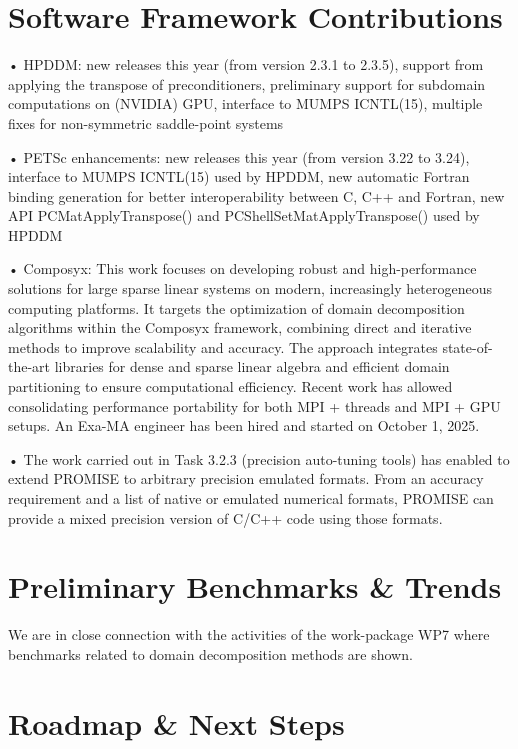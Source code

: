 \section{Software Framework Contributions}
 • HPDDM: new releases this year (from version 2.3.1 to 2.3.5), support from applying the transpose of preconditioners, preliminary support for subdomain computations on (NVIDIA) GPU, interface to MUMPS ICNTL(15), multiple fixes for non-symmetric saddle-point systems
 
 • PETSc enhancements: new releases this year (from version 3.22 to 3.24), interface to MUMPS ICNTL(15) used by HPDDM, new automatic Fortran binding generation for better interoperability between C, C++ and Fortran, new API PCMatApplyTranspose() and PCShellSetMatApplyTranspose() used by HPDDM
 
 • Composyx: %
 This work focuses on developing robust and high-performance solutions for large sparse linear systems on modern, increasingly heterogeneous computing platforms. It targets the optimization of domain decomposition algorithms within the Composyx framework, combining direct and iterative methods to improve scalability and accuracy. The approach integrates state-of-the-art libraries for dense and sparse linear algebra and efficient domain partitioning to ensure computational efficiency. Recent work has allowed consolidating performance portability for both MPI + threads and MPI + GPU setups. An Exa-MA engineer has been hired and started on October 1, 2025.
 
 • %
The work carried out in Task 3.2.3 (precision auto-tuning tools) has enabled to extend PROMISE to arbitrary precision emulated formats. 
From an accuracy requirement and a list of native or emulated numerical formats, PROMISE can provide a mixed precision version of C/C++ code using those formats.

\section{Preliminary Benchmarks \& Trends}
We are in close connection with the activities of the work-package WP7 where benchmarks related to domain decomposition methods are shown. 

\section{Roadmap \& Next Steps}

